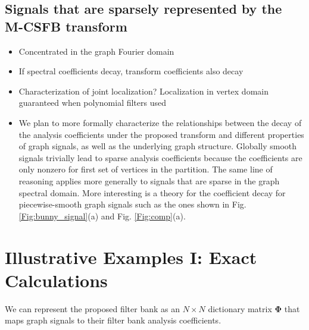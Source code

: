 \documentclass[journal, 10pt]{IEEEtran}
\begin{document}
{\color{red}

\subsection{Signals that are sparsely represented by the M-CSFB transform}
\begin{itemize}
\item Concentrated in the graph Fourier domain
\item If spectral coefficients decay, transform coefficients also decay
\item Characterization of joint localization? Localization in vertex domain guaranteed when polynomial filters used
\item We  plan to more formally characterize the relationships between the decay of the analysis coefficients under the proposed transform and different properties of graph signals, as well as the underlying graph structure.
Globally smooth signals trivially lead to sparse analysis coefficients because the coefficients are only nonzero for first set of vertices in the partition. The same line of reasoning applies more generally to signals that are sparse in the graph spectral domain. More interesting is a theory for the coefficient decay for piecewise-smooth graph signals such as the ones shown in Fig. \ref{Fig:bunny_signal}(a) and Fig. \ref{Fig:comp}(a).
\end{itemize}
}

\section{Illustrative Examples I: Exact Calculations}
We can represent the proposed filter bank as an $N \times N$ dictionary matrix $\boldsymbol{\Phi}$ that maps graph signals to their filter bank analysis coefficients. 
\end{document}
